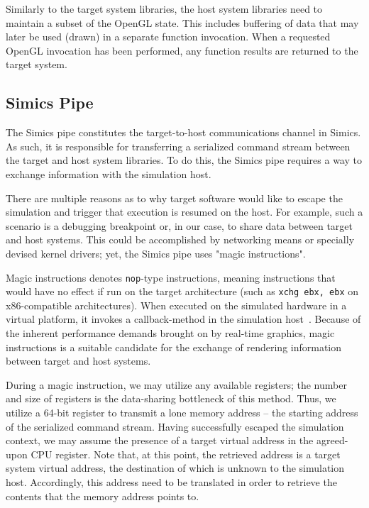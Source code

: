 \documentclass{article}
\newcommand{\masccite}[2][]{\cite{#2}}
\newcommand{\masccodeinline}[1]{\colorbox{black!5}{\lstinline[basicstyle=\ttfamily\color{black}]{#1}}}
\begin{document}
Similarly to the target system libraries, the host system libraries need to maintain a subset of the OpenGL state.
This includes buffering of data that may later be used (drawn) in a separate function invocation.
When a requested OpenGL invocation has been performed, any function results are returned to the target system.

\subsection{Simics Pipe}
\label{sec:proposedsolutionandimplementation_simicspipe}
The Simics pipe constitutes the target-to-host communications channel in Simics.
As such, it is responsible for transferring a serialized command stream between the target and host system libraries.
To do this, the Simics pipe requires a way to exchange information with the simulation host.

There are multiple reasons as to why target software would like to escape the simulation and trigger that execution is resumed on the host.
For example, such a scenario is a debugging breakpoint or, in our case, to share data between target and host systems.
This could be accomplished by networking means or specially devised kernel drivers; yet, the Simics pipe uses "magic instructions".

Magic instructions denotes \masccodeinline{nop}-type instructions, meaning instructions that would have no effect if run on the target architecture (such as \masccodeinline{xchg ebx, ebx} on x86-compatible architectures).
When executed on the simulated hardware in a virtual platform, it invokes a callback-method in the simulation host~\masccite[p.~32]{publications:leupers:2010}.
Because of the inherent performance demands brought on by real-time graphics, magic instructions is a suitable candidate for the exchange of rendering information between target and host systems.

During a magic instruction, we may utilize any available registers; the number and size of registers is the data-sharing bottleneck of this method.
Thus, we utilize a 64-bit register to transmit a lone memory address -- the starting address of the serialized command stream.
Having successfully escaped the simulation context, we may assume the presence of a target virtual address in the agreed-upon CPU register.
Note that, at this point, the retrieved address is a target system virtual address, the destination of which is unknown to the simulation host.
Accordingly, this address need to be translated in order to retrieve the contents that the memory address points to.
\end{document}
